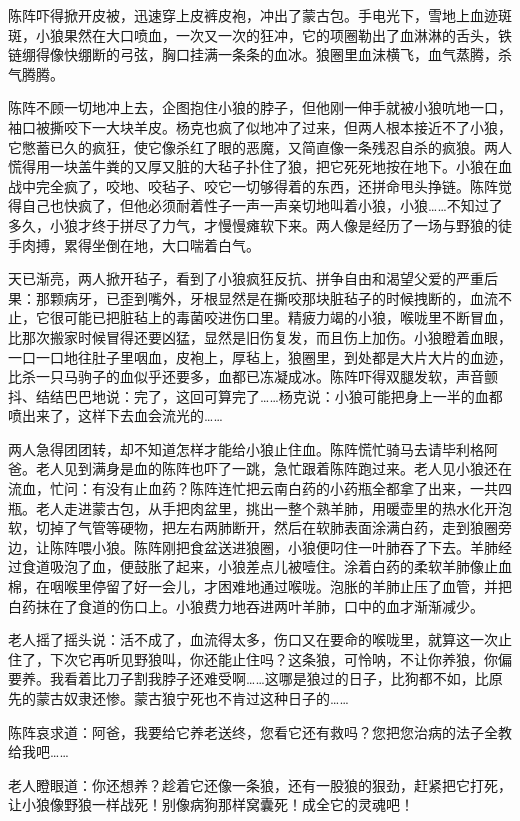 \par 陈阵吓得掀开皮被，迅速穿上皮裤皮袍，冲出了蒙古包。手电光下，雪地上血迹斑斑，小狼果然在大口喷血，一次又一次的狂冲，它的项圈勒出了血淋淋的舌头，铁链绷得像快绷断的弓弦，胸口挂满一条条的血冰。狼圈里血沫横飞，血气蒸腾，杀气腾腾。
\par 陈阵不顾一切地冲上去，企图抱住小狼的脖子，但他刚一伸手就被小狼吭地一口，袖口被撕咬下一大块羊皮。杨克也疯了似地冲了过来，但两人根本接近不了小狼，它憋蓄已久的疯狂，使它像杀红了眼的恶魔，又简直像一条残忍自杀的疯狼。两人慌得用一块盖牛粪的又厚又脏的大毡子扑住了狼，把它死死地按在地下。小狼在血战中完全疯了，咬地、咬毡子、咬它一切够得着的东西，还拼命甩头挣链。陈阵觉得自己也快疯了，但他必须耐着性子一声一声亲切地叫着小狼，小狼……不知过了多久，小狼才终于拼尽了力气，才慢慢瘫软下来。两人像是经历了一场与野狼的徒手肉搏，累得坐倒在地，大口喘着白气。
\par 天已渐亮，两人掀开毡子，看到了小狼疯狂反抗、拼争自由和渴望父爱的严重后果：那颗病牙，已歪到嘴外，牙根显然是在撕咬那块脏毡子的时候拽断的，血流不止，它很可能已把脏毡上的毒菌咬进伤口里。精疲力竭的小狼，喉咙里不断冒血，比那次搬家时候冒得还要凶猛，显然是旧伤复发，而且伤上加伤。小狼瞪着血眼，一口一口地往肚子里咽血，皮袍上，厚毡上，狼圈里，到处都是大片大片的血迹，比杀一只马驹子的血似乎还要多，血都已冻凝成冰。陈阵吓得双腿发软，声音颤抖、结结巴巴地说：完了，这回可算完了……杨克说：小狼可能把身上一半的血都喷出来了，这样下去血会流光的……
\par 两人急得团团转，却不知道怎样才能给小狼止住血。陈阵慌忙骑马去请毕利格阿爸。老人见到满身是血的陈阵也吓了一跳，急忙跟着陈阵跑过来。老人见小狼还在流血，忙问：有没有止血药？陈阵连忙把云南白药的小药瓶全都拿了出来，一共四瓶。老人走进蒙古包，从手把肉盆里，挑出一整个熟羊肺，用暖壶里的热水化开泡软，切掉了气管等硬物，把左右两肺断开，然后在软肺表面涂满白药，走到狼圈旁边，让陈阵喂小狼。陈阵刚把食盆送进狼圈，小狼便叼住一叶肺吞了下去。羊肺经过食道吸泡了血，便鼓胀了起来，小狼差点儿被噎住。涂着白药的柔软羊肺像止血棉，在咽喉里停留了好一会儿，才困难地通过喉咙。泡胀的羊肺止压了血管，并把白药抹在了食道的伤口上。小狼费力地吞进两叶羊肺，口中的血才渐渐减少。
\par 老人摇了摇头说：活不成了，血流得太多，伤口又在要命的喉咙里，就算这一次止住了，下次它再听见野狼叫，你还能止住吗？这条狼，可怜呐，不让你养狼，你偏要养。我看着比刀子割我脖子还难受啊……这哪是狼过的日子，比狗都不如，比原先的蒙古奴隶还惨。蒙古狼宁死也不肯过这种日子的……
\par 陈阵哀求道：阿爸，我要给它养老送终，您看它还有救吗？您把您治病的法子全教给我吧……
\par 老人瞪眼道：你还想养？趁着它还像一条狼，还有一股狼的狠劲，赶紧把它打死，让小狼像野狼一样战死！别像病狗那样窝囊死！成全它的灵魂吧！
